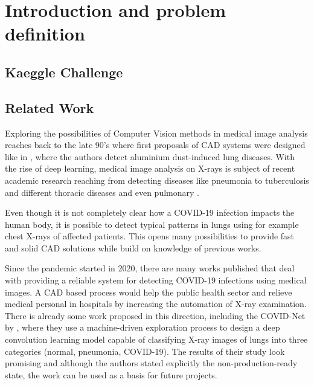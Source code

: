 \chapter{Introduction and problem definition}\label{chapter:intro}

\section{Kaeggle Challenge}

\section{Related Work}
Exploring the possibilities of Computer Vision methods in medical image analysis reaches back to the late 90's where first proposals of \ac{CAD} systems were designed like in \autocite{kraus2000aluminium}, where the authors detect aluminium dust-induced lung diseases.
With the rise of deep learning, medical image analysis on X-rays is subject of recent academic research reaching from detecting diseases like pneumonia \autocite{pneumoniaDetection} \autocite{pneumoniaDetection2} \autocite{gupta2019evolutionary} to tuberculosis and different thoracic diseases \autocite{jangam2021deep} and even pulmonary \autocite{vieira2021detecting}. 

Even though it is not completely clear how a COVID-19 infection impacts the human body, it is possible to detect typical patterns in lungs using for example chest X-rays of affected patients. This opens many possibilities to provide fast and solid \ac{CAD} solutions while build on knowledge of previous works.

Since the pandemic started in 2020, there are many works published that deal with providing a reliable system for detecting COVID-19 infections using medical images. A \ac{CAD} based process would help the public health sector and relieve medical personal in hospitals by increasing the automation of X-ray examination.
There is already some work proposed in this direction, including the COVID-Net \autocite{wang2020covid} by \citeauthor{wang2020covid}, where they use a machine-driven exploration process to design a deep convolution learning model capable of classifying X-ray images of lungs into three categories (normal, pneumonia, COVID-19). The results of their study look promising and although the authors stated explicitly the non-production-ready state, the work can be used as a basis for future projects.

